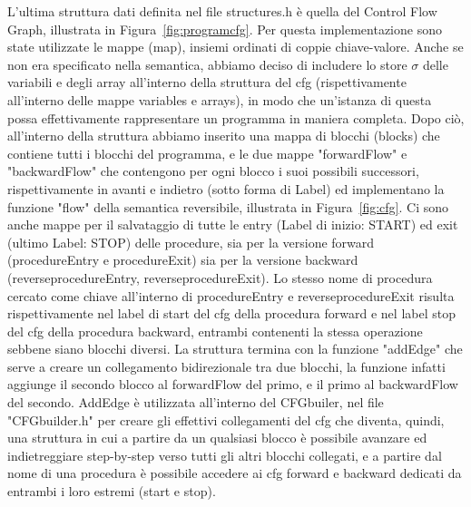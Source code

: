 \documentclass{article}
\theoremstyle{plain}
\theoremstyle{definition}
\theoremstyle{plain}
\begin{document}
L'ultima struttura dati definita nel file structures.h è quella del Control Flow Graph, illustrata in Figura~\ref{fig:programcfg}. Per questa implementazione sono state utilizzate le mappe (map), insiemi ordinati di coppie chiave-valore. Anche se non era specificato nella semantica, abbiamo deciso di includere lo store $\sigma$ delle variabili e degli array all'interno della struttura del cfg (rispettivamente all'interno delle mappe variables e arrays), in modo che un'istanza di questa possa effettivamente rappresentare un programma in maniera completa. Dopo ciò, all'interno della struttura abbiamo inserito una mappa di blocchi (blocks) che contiene tutti i blocchi del programma, e le due mappe "forwardFlow" e "backwardFlow" che contengono per ogni blocco i suoi possibili successori, rispettivamente in avanti e indietro (sotto forma di Label) ed implementano la funzione "flow" della semantica reversibile, illustrata in Figura~\ref{fig:cfg}. Ci sono anche mappe per il salvataggio di tutte le entry (Label di inizio: START) ed exit (ultimo Label: STOP) delle procedure, sia per la versione forward (procedureEntry e procedureExit) sia per la versione backward (reverseprocedureEntry, reverseprocedureExit). Lo stesso nome di procedura cercato come chiave all'interno di procedureEntry e reverseprocedureExit risulta rispettivamente nel label di start del cfg della procedura forward e nel label stop del cfg della procedura backward, entrambi contenenti la stessa operazione sebbene siano blocchi diversi. La struttura termina con la funzione "addEdge" che serve a creare un collegamento bidirezionale tra due blocchi, la funzione infatti aggiunge il secondo blocco al forwardFlow del primo, e il primo al backwardFlow del secondo. AddEdge è utilizzata all'interno del CFGbuiler, nel file "CFGbuilder.h" per creare gli effettivi collegamenti del cfg che diventa, quindi, una struttura in cui a partire da un qualsiasi blocco è possibile avanzare ed indietreggiare step-by-step verso tutti gli altri blocchi collegati, e a partire dal nome di una procedura è possibile accedere ai cfg forward e backward dedicati da entrambi i loro estremi (start e stop).
\end{document}
